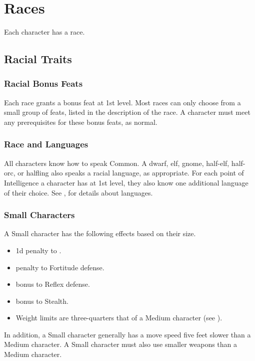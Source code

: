 \chapter{Races}\label{Races}

Each character has a race.

\section{Racial Traits}

\subsection{Racial Bonus Feats}
Each race grants a bonus feat at 1st level. Most races can only choose from a small group of feats, listed in the description of the race. A character must meet any prerequisites for these bonus feats, as normal.

\subsection{Race and Languages}
All characters know how to speak Common. A dwarf, elf, gnome, half-elf, half-orc, or halfling also speaks a racial language, as appropriate. For each point of Intelligence a character has at 1st level, they also know one additional language of their choice. See , for details about languages.

\subsection{Small Characters}\label{Small Characters}
A Small character has the following effects based on their size.
  \begin{itemize}
    \item \minus1d penalty to .
    \item {} penalty to Fortitude defense.
    \item {} bonus to Reflex defense.
    \item {} bonus to Stealth.
    \item Weight limits are three-quarters that of a Medium character (see ).
  \end{itemize}

In addition, a Small character generally has a move speed five feet slower than a Medium character. A Small character must also use smaller weapons than a Medium character.


